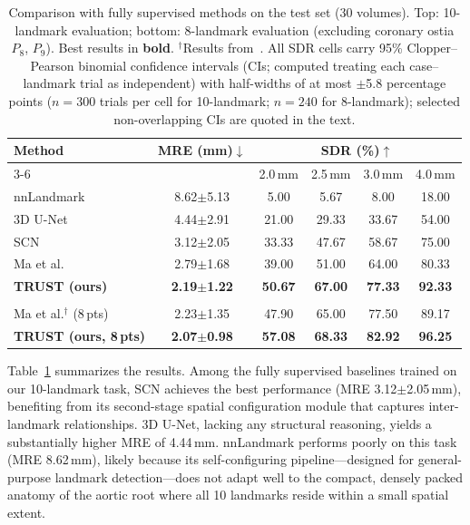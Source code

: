\documentclass[conference]{IEEEtran}
\begin{document}
\begin{table}[t]
\centering
\caption{Comparison with fully supervised methods on the test set (30 volumes). Top: 10-landmark evaluation; bottom: 8-landmark evaluation (excluding coronary ostia $P_8$, $P_9$). Best results in \textbf{bold}. $^\dagger$Results from~\cite{Ma2023_aortic_landmarks}. All SDR cells carry 95\% Clopper--Pearson binomial confidence intervals (CIs; computed treating each case--landmark trial as independent) with half-widths of at most $\pm$5.8 percentage points ($n = 300$ trials per cell for 10-landmark; $n = 240$ for 8-landmark); selected non-overlapping CIs are quoted in the text.}
\label{tab:comparison}
\setlength{\tabcolsep}{3pt}
\begin{tabular}{l c c c c c}
\toprule
\multirow{2}{*}{Method} & \multirow{2}{*}{MRE (mm)$\downarrow$} & \multicolumn{4}{c}{SDR (\%)$\uparrow$} \\
\cmidrule(lr){3-6}
 & & \scriptsize 2.0\,mm & \scriptsize 2.5\,mm & \scriptsize 3.0\,mm & \scriptsize 4.0\,mm \\
\midrule
nnLandmark           & 8.62$\pm$5.13 & 5.00  & 5.67  & 8.00  & 18.00 \\
3D U-Net             & 4.44$\pm$2.91 & 21.00 & 29.33 & 33.67 & 54.00 \\
SCN                  & 3.12$\pm$2.05 & 33.33 & 47.67 & 58.67 & 75.00 \\
Ma et al.            & 2.79$\pm$1.68 & 39.00 & 51.00 & 64.00 & 80.33 \\
\midrule
\textbf{TRUST (ours)} & \textbf{2.19$\pm$1.22} & \textbf{50.67} & \textbf{67.00} & \textbf{77.33} & \textbf{92.33} \\
\midrule
\addlinespace[5pt]
\midrule
\multicolumn{6}{l}{\emph{8-landmark evaluation (excluding $P_8$, $P_9$)}} \\
\midrule
Ma et al.$^\dagger$ (8\,pts) & 2.23$\pm$1.35 & 47.90 & 65.00 & 77.50 & 89.17 \\
\textbf{TRUST (ours, 8\,pts)} & \textbf{2.07$\pm$0.98} & \textbf{57.08} & \textbf{68.33} & \textbf{82.92} & \textbf{96.25} \\
\bottomrule
\end{tabular}
\end{table}

Table~\ref{tab:comparison} summarizes the results. Among the fully supervised baselines trained on our 10-landmark task, SCN achieves the best performance (MRE 3.12$\pm$2.05\,mm), benefiting from its second-stage spatial configuration module that captures inter-landmark relationships. 3D U-Net, lacking any structural reasoning, yields a substantially higher MRE of 4.44\,mm. nnLandmark performs poorly on this task (MRE 8.62\,mm), likely because its self-configuring pipeline---designed for general-purpose landmark detection---does not adapt well to the compact, densely packed anatomy of the aortic root where all 10 landmarks reside within a small spatial extent.
\end{document}
